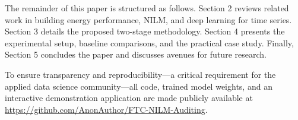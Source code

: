 The remainder of this paper is structured as follows. Section 2 reviews related work in building energy performance, NILM, and deep learning for time series. Section 3 details the proposed two-stage methodology. Section 4 presents the experimental setup, baseline comparisons, and the practical case study. Finally, Section 5 concludes the paper and discusses avenues for future research.

To ensure transparency and reproducibility---a critical requirement for the applied data science community---all code, trained model weights, and an interactive demonstration application are made publicly available at \url{https://github.com/AnonAuthor/FTC-NILM-Auditing}.
